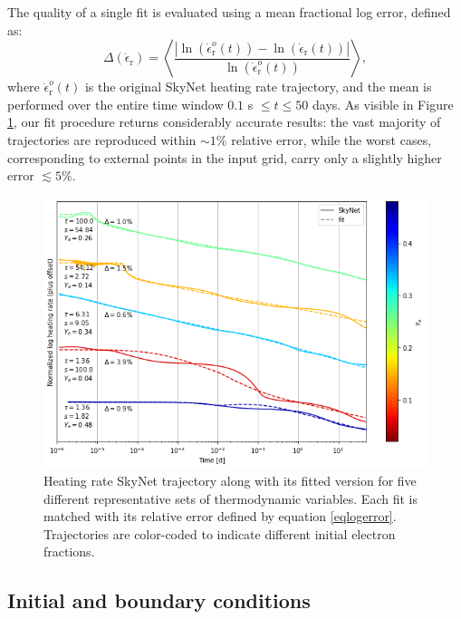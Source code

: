 \documentclass[fleqn,usenatbib]{mnras}
\begin{document}
    The quality of a single fit is evaluated using a mean fractional log error, defined as:
    \begin{equation}
    \label{eqlogerror}
    \Delta(\dot{\epsilon}_{\mathrm{r}})=\left<\frac{|\ln(\dot{\epsilon}_{\mathrm{r}}^o(t))-\ln(\dot{\epsilon}_{\mathrm{r}}(t))|}{\ln(\dot{\epsilon}_{\mathrm{r}}^o(t))}\right>,
    \end{equation}
    where $\dot{\epsilon}_{\mathrm{r}}^o(t)$ is the original SkyNet heating rate trajectory, and the mean is performed over the entire time window $0.1$ s $\leq t\leq50$ days. As visible in Figure \ref{fiterror}, our fit procedure returns considerably accurate results: the vast majority of trajectories are reproduced within $\sim1\%$ relative error, while the worst cases, corresponding to external points in the input grid, carry only a slightly higher error $\lesssim 5\%$.
    \begin{figure}
    \centering
    \includegraphics[scale=0.4]{figures/heating/heating rate fits/fiterror.png}
    \caption{Heating rate SkyNet trajectory along with its fitted version for five different representative sets of thermodynamic variables. Each fit is matched with its relative error defined by equation \ref{eqlogerror}. Trajectories are color-coded to indicate different initial electron fractions.}
    \label{fiterror}
    \end{figure}
    
    
    \subsection{Initial and boundary conditions} 
    
\end{document}
